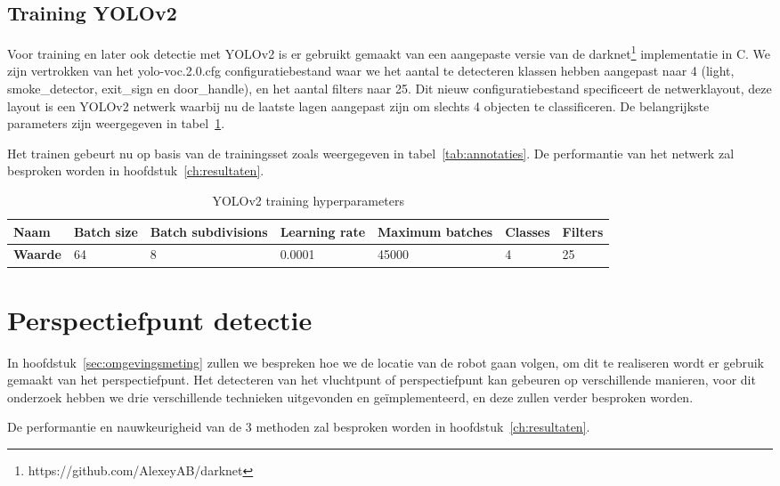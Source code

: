 \subsection{Training YOLOv2}

Voor training en later ook detectie met YOLOv2 is er gebruikt gemaakt van een aangepaste versie van de darknet\footnote{https://github.com/AlexeyAB/darknet} implementatie in C.
We zijn vertrokken van het yolo-voc.2.0.cfg configuratiebestand waar we het aantal te detecteren klassen hebben aangepast naar 4 (light, smoke\_detector, exit\_sign en door\_handle), en het aantal filters naar 25.
Dit nieuw configuratiebestand specificeert de netwerklayout, deze layout is een YOLOv2 netwerk waarbij nu de laatste lagen aangepast zijn om slechts 4 objecten te classificeren.
De belangrijkste parameters zijn weergegeven in tabel~\ref{tab:hyperparameters}.

Het trainen gebeurt nu op basis van de trainingsset zoals weergegeven in tabel~\ref{tab:annotaties}. De performantie van het netwerk zal besproken worden in hoofdstuk~\ref{ch:resultaten}.

\begin{table}[h]
    \centering
    \caption{YOLOv2 training hyperparameters} \label{tab:hyperparameters}
    \begin{tabular}{l | l | l | l | l | l | l}
        \textbf{Naam} & Batch size & Batch subdivisions & Learning rate & Maximum batches & Classes & Filters \\
        \hline
        \textbf{Waarde} & 64 & 8 & 0.0001 & 45000 & 4 & 25
    \end{tabular}
\end{table}


\section{Perspectiefpunt detectie}\label{sec:perspectiefpunt_detectie}

In hoofdstuk~\ref{sec:omgevingsmeting} zullen we bespreken hoe we de locatie van de robot gaan volgen, om dit te realiseren wordt er gebruik gemaakt van het perspectiefpunt.
Het detecteren van het vluchtpunt of perspectiefpunt kan gebeuren op verschillende manieren, voor dit onderzoek hebben we drie verschillende technieken uitgevonden en ge\"{i}mplementeerd, en deze zullen verder besproken worden.

De performantie en nauwkeurigheid van de 3 methoden zal besproken worden in hoofdstuk~\ref{ch:resultaten}.

